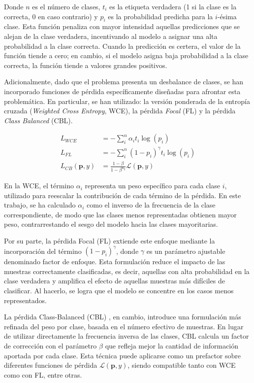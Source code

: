 Donde $n$ es el número de clases, $t_i$ es la etiqueta verdadera (1 si la clase es la correcta, 0 en caso contrario) y $p_i$ es la probabilidad predicha para la $i$-ésima clase. Esta función penaliza con mayor intensidad aquellas predicciones que se alejan de la clase verdadera, incentivando al modelo a asignar una alta probabilidad a la clase correcta. Cuando la predicción es certera, el valor de la función tiende a cero; en cambio, si el modelo asigna baja probabilidad a la clase correcta, la función tiende a valores grandes positivos.

Adicionalmente, dado que el problema presenta un desbalance de clases, se han incorporado funciones de pérdida específicamente diseñadas para afrontar esta problemática. En particular, se han utilizado: la versión ponderada de la entropía cruzada (\textit{Weighted Cross Entropy}, WCE), la pérdida \textit{Focal} (FL) y la pérdida \textit{Class Balanced} (CBL).

\begin{align}
    L_{WCE} &= -\sum_i^n \alpha_{i} t_i \log(p_i) \\
    L_{FL} &= -\sum_i^n (1-p_i)^{\gamma} t_i \log(p_i) \\
    L_{CB}(\textbf{p},y) &= \frac{1-\beta}{1-\beta^{n_{y}}} \mathcal{L}(\textbf{p},y)
\end{align}

En la WCE, el término $\alpha_i$ representa un peso específico para cada clase $i$, utilizado para reescalar la contribución de cada término de la pérdida. En este trabajo, se ha calculado $\alpha_i$ como el inverso de la frecuencia de la clase correspondiente, de modo que las clases menos representadas obtienen mayor peso, contrarrestando el sesgo del modelo hacia las clases mayoritarias.

Por su parte, la pérdida Focal (FL) \cite{lin_focal_2020} extiende este enfoque mediante la incorporación del término $(1 - p_i)^\gamma$, donde $\gamma$ es un parámetro ajustable denominado factor de enfoque. Esta formulación reduce el impacto de las muestras correctamente clasificadas, es decir, aquellas con alta probabilidad en la clase verdadera y amplifica el efecto de aquellas muestras más difíciles de clasificar. Al hacerlo, se logra que el modelo se concentre en los casos menos representados.

La pérdida Class-Balanced (CBL) \cite{cui_class-balanced_2019}, en cambio, introduce una formulación más refinada del peso por clase, basada en el número efectivo de muestras. En lugar de utilizar directamente la frecuencia inversa de las clases, CBL calcula un factor de corrección con el parámetro $\beta$ que refleja mejor la cantidad de información aportada por cada clase. Esta técnica puede aplicarse como un prefactor sobre diferentes funciones de pérdida $\mathcal{L}(\mathbf{p}, y)$, siendo compatible tanto con WCE como con FL, entre otras.

